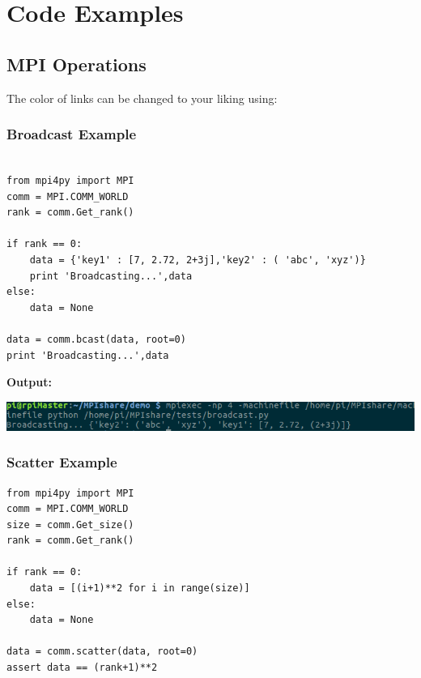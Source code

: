 
\chapter{Code Examples} %

\label{AppendixA} %

\section{MPI Operations}

The color of links can be changed to your liking using:
%
%
%
%
%
%
%
%

\subsection {Broadcast Example}
\label{appendix:broadcast}
\begin{verbatim}

from mpi4py import MPI
comm = MPI.COMM_WORLD
rank = comm.Get_rank()

if rank == 0:
	data = {'key1' : [7, 2.72, 2+3j],'key2' : ( 'abc', 'xyz')}
	print 'Broadcasting...',data
else:
	data = None
	
data = comm.bcast(data, root=0)
print 'Broadcasting...',data

\end{verbatim}

\bf{Output:}
\begin{center}
\includegraphics[scale=0.7]{Figures/broadcast-output}
\end{center}

\subsection {Scatter Example}
\label{appendix:scatter}
\begin{verbatim}
from mpi4py import MPI
comm = MPI.COMM_WORLD
size = comm.Get_size()
rank = comm.Get_rank()

if rank == 0:
	data = [(i+1)**2 for i in range(size)]
else:
	data = None

data = comm.scatter(data, root=0)
assert data == (rank+1)**2

\end{verbatim}

